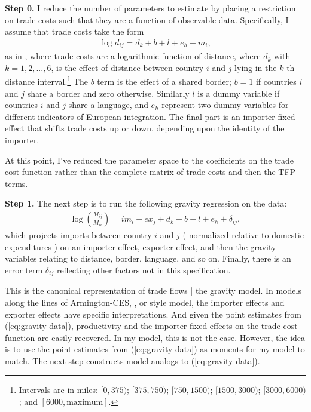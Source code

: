 \documentclass[12pt,pdftex]{article}
\begin{document}
\begin{onehalfspacing}
\textbf{Step 0.} I reduce the number of parameters to estimate by placing a restriction on trade costs such that they are a function of observable data. Specifically, I assume that trade costs take the form
\begin{align}
\log d_{ij} = d_{k} + b + l + e_{h} + m_{i},
\label{eq:trade-cost-function}
\end{align}
as in \citet{eaton2002technology}, where trade costs are a logarithmic function of distance, where $d_k$ with $k = 1,2,...,6$, is the effect of distance between country $i$ and $j$ lying in the $k$-th distance interval.\footnote{Intervals are in miles: $[0,375)$; $[375,750)$; $[750,1500)$; $[1500,3000)$; $[3000,6000)$; and $[6000,\mbox{maximum}]$. } The $b$ term is the effect of a shared border; $b =1$ if countries $i$ and $j$ share a border and zero otherwise. Similarly $l$ is a dummy variable if countries $i$ and $j$ share a language, and $e_{h}$ represent two dummy variables for different indicators of European integration. The final part is an importer fixed effect that shifts trade costs up or down, depending upon the identity of the importer.

At this point, I've reduced the parameter space to the  coefficients on the trade cost function rather than the complete matrix of trade costs and then the TFP terms.

\textbf{Step 1.} The next step is to run the following gravity regression on the data:
\begin{align}
\log \left( {\frac{M_{ij}}{M_{ii}}} \right) = {im_{i}} + {ex_{j}} + {d_{k}} + {b} + {l} + {e_{h}} + \delta_{ij},
\label{eq:gravity-data}
\end{align}
which projects imports between country $i$ and $j$ ( normalized relative to domestic expenditures ) on an importer effect, exporter effect, and then the gravity variables relating to distance, border, language, and so on. Finally, there is an error term $\delta_{ij}$ reflecting other factors not in this specification.

This is the canonical representation of trade flows | the gravity model. In models along the lines of Armington-CES, \citet{eaton2002technology}, or \citet{melitz2003impact} style model, the importer effects and exporter effects have specific interpretations. And given the point estimates from (\ref{eq:gravity-data}), productivity and the importer fixed effects on the trade cost function are easily recovered. In my model, this is not the case. However, the idea is to use the point estimates from (\ref{eq:gravity-data}) as moments for my model to match. The next step constructs model analogs to (\ref{eq:gravity-data}).


\end{onehalfspacing}
\end{document}
